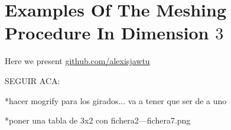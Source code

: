 \section{Examples Of The Meshing Procedure In Dimension $3$} %
\label{sec:examples_of_the_meshing_procedure}

\tauZero
\tauOneEn


Here we present
\href{https://github.com/alexisjawtu/mesher}{github.com/alexisjawtu}


SEGUIR ACA: 


*hacer mogrify para los girados... va a tener que ser de a uno


*poner una tabla de 3x2 con fichera2---fichera7.png


